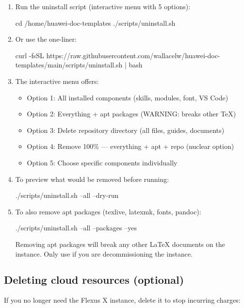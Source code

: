 \documentclass{guide}
\begin{document}
\stepbystep
\begin{enumerate}
  \item Run the uninstall script (interactive menu with 5 options):
  \begin{code}[bash]
cd /home/huawei-doc-templates
./scripts/uninstall.sh
  \end{code}
  \item Or use the one-liner:
  \begin{code}[bash]
curl -fsSL https://raw.githubusercontent.com/wallacelw/huawei-doc-templates/main/scripts/uninstall.sh | bash
  \end{code}
  \item The interactive menu offers:
  \begin{itemize}
    \item Option 1: All installed components (skills, modules, font, VS Code)
    \item Option 2: Everything + apt packages (WARNING: breaks other TeX)
    \item Option 3: Delete repository directory (all files, guides, documents)
    \item Option 4: Remove 100\% --- everything + apt + repo (nuclear option)
    \item Option 5: Choose specific components individually
  \end{itemize}
  \item To preview what would be removed before running:
  \begin{code}[bash]
./scripts/uninstall.sh --all --dry-run
  \end{code}
  \item To also remove apt packages (texlive, latexmk, fonts, pandoc):
  \begin{code}[bash]
./scripts/uninstall.sh --all --packages --yes
  \end{code}
  \begin{warning}
  Removing apt packages will break any other LaTeX documents on the instance.
  Only use  if you are decommissioning the instance.
  \end{warning}
\end{enumerate}

\subsection{Deleting cloud resources (optional)}

If you no longer need the Flexus X instance, delete it to stop incurring
charges:
\end{document}
